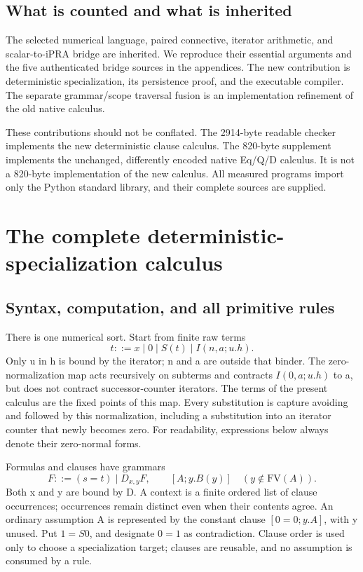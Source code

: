 \documentclass[11pt,letterpaper]{article}
\theoremstyle{definition}
\begin{document}
\subsection{What is counted and what is inherited}

The selected numerical language, paired connective, iterator arithmetic,
and scalar-to-iPRA bridge are inherited. We reproduce their essential
arguments and the five authenticated bridge sources in the appendices.
The new contribution is deterministic specialization, its persistence
proof, and the executable compiler. The separate grammar/scope traversal
fusion is an implementation refinement of the old native calculus.

These contributions should not be conflated. The 2914-byte readable
checker implements the new deterministic clause calculus. The 820-byte
supplement implements the unchanged, differently encoded native Eq/Q/D
calculus. It is not a 820-byte implementation of the new calculus.
All measured programs import only the Python standard library, and
their complete sources are supplied.

\section{The complete deterministic-specialization calculus}
\label{sec:deterministic-specialization}

\subsection{Syntax, computation, and all primitive rules}

There is one numerical sort.  Start from finite raw terms
\[
 t ::= x\mid 0\mid S(t)\mid I(n,a;u.h).
\]
Only u in h is bound by the iterator; n and a are outside that binder.
The zero-normalization map acts recursively on subterms and contracts
\(I(0,a;u.h)\) to a, but does not contract successor-counter iterators.
The terms of the present calculus are the fixed points of this map.
Every substitution is capture avoiding and followed by this normalization,
including a substitution into an iterator counter that newly becomes zero.
For readability, expressions below always denote their zero-normal forms.

Formulas and clauses have grammars
\[
 F ::= (s=t)\mid D_{x,y}F,\qquad [A;y.B(y)]\quad(y\notin\mathrm{FV}(A)).
\]
Both x and y are bound by D.  A context is a finite ordered list of clause
occurrences; occurrences remain distinct even when their contents agree.
An ordinary assumption A is represented by the constant clause
\([0=0;y.A]\), with y unused.  Put \(1=S0\), and designate \(0=1\)
as contradiction.  Clause order is used only to choose a specialization
target; clauses are reusable, and no assumption is consumed by a rule.
\end{document}
